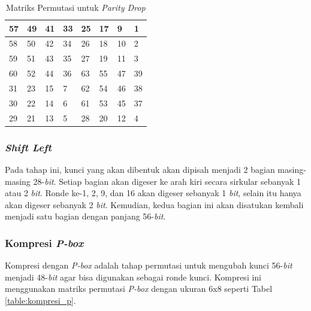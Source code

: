 \begin{table}[H]
	\begin{center}
		\begin{tabular}{|l|l|l|l|l|l|l|l|}
				\hline
				57	&	49	&	41	&	33	&	25	&	17	&	9	&	1	\\ \hline
				58	&	50	&	42	&	34	&	26	&	18	&	10	&	2	\\ \hline
				59	&	51	&	43	&	35	&	27	&	19	&	11	&	3	\\ \hline
				60	&	52	&	44	&	36	&	63	&	55	&	47	&	39	\\ \hline
				31	&	23	&	15	&	7	&	62	&	54	&	46	&	38	\\ \hline
				30	&	22	&	14	&	6	&	61	&	53	&	45	&	37	\\ \hline
				29	&	21	&	13	&	5	&	28	&	20	&	12	&	4	\\ \hline
		\end{tabular}
	\end{center}
	\caption{Matriks Permutasi untuk \textit{Parity Drop}}\label{table:parity_drop}
\end{table}


\subsubsection{\textit{Shift Left}}
Pada tahap ini, kunci yang akan dibentuk akan dipisah menjadi 2 bagian masing-masing 28-\textit{bit}. Setiap bagian akan digeser ke arah kiri secara sirkular sebanyak 1 atau 2 \textit{bit}. Ronde ke-1, 2, 9, dan 16 akan digeser sebanyak 1 \textit{bit}, selain itu hanya akan digeser sebanyak 2 \textit{bit}. Kemudian, kedua bagian ini akan disatukan kembali menjadi satu bagian dengan panjang 56-\textit{bit}.

\subsubsection{Kompresi \textit{P-box}}
\label{sssec:kompresi_Pbox}
Kompresi dengan \textit{P-box} adalah tahap permutasi untuk mengubah kunci 56-\textit{bit} menjadi 48-\textit{bit} agar bisa digunakan sebagai ronde kunci. Kompresi ini menggunakan matriks permutasi \textit{P-box} dengan ukuran 6x8 seperti Tabel \ref{table:kompresi_p}.

